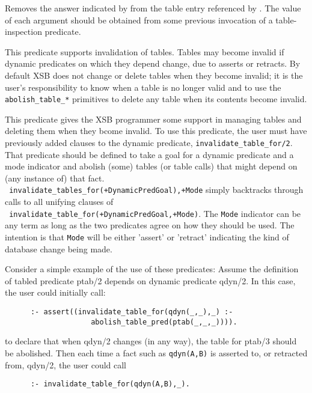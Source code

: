 \begin{description}
\begin{description}

%
Removes the answer indicated by  from the table
entry referenced by .  The value of each
argument should be obtained from some previous invocation of a
table-inspection predicate.



This predicate supports invalidation of tables.  Tables may become
invalid if dynamic predicates on which they depend change, due to
asserts or retracts.  By default XSB does not change or delete tables
when they become invalid; it is the user's responsibility to know when
a table is no longer valid and to use the {\tt abolish\_table\_*}
primitives to delete any table when its contents become invalid.

This predicate gives the XSB programmer some support in managing
tables and deleting them when they bcome invalid.  To use this
predicate, the user must have previously added clauses to the dynamic
predicate, {\tt invalidate\_table\_for/2}.  That predicate should be
defined to take a goal for a dynamic predicate and a mode indicator
and abolish (some) tables (or table calls) that might depend on (any
instance of) that fact.  \\ {\tt
invalidate\_tables\_for(+DynamicPredGoal),+Mode} simply backtracks
through calls to all unifying clauses of \\ {\tt
invalidate\_table\_for(+DynamicPredGoal,+Mode)}.  The {\tt Mode}
indicator can be any term as long as the two predicates agree on how
they should be used.  The intention is that {\tt Mode} will be either
'assert' or 'retract' indicating the kind of database change being
made.

Consider a simple example of the use of these predicates: Assume the
definition of tabled predicate ptab/2 depends on dynamic predicate
qdyn/2.  In this case, the user could initially call:
\begin{verbatim}
      :- assert((invalidate_table_for(qdyn(_,_),_) :-
                    abolish_table_pred(ptab(_,_,_)))).
\end{verbatim}
to declare that when qdyn/2 changes (in any way), the table for ptab/3
should be abolished.  Then each time a fact such as {\tt qdyn(A,B)} is
asserted to, or retracted from, qdyn/2, the user could call
\begin{verbatim}
      :- invalidate_table_for(qdyn(A,B),_).
\end{verbatim}


\end{description}
\end{description}
